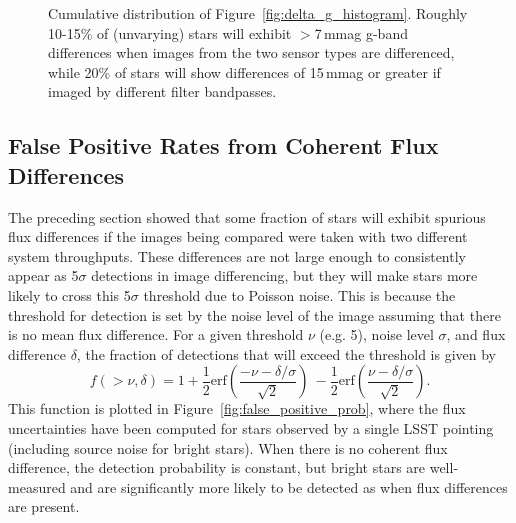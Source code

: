 \documentclass[DM,toc]{lsstdoc}
\begin{document}
\begin{figure}
\caption{Cumulative distribution of Figure~\ref{fig:delta_g_histogram}. Roughly
10-15\% of (unvarying) stars will exhibit $>$7\,mmag g-band differences when
images from the two sensor types are differenced, while 20\% of stars will show
differences of 15\,mmag or greater if imaged by different filter bandpasses.
\label{fig:delta_g_cumulative}}
\end{figure}


\subsection{False Positive Rates from Coherent Flux Differences}

The preceding section showed that some fraction of stars will exhibit spurious
flux differences if the images being compared were taken with two different
system throughputs. These differences are not large enough to consistently
appear as 5$\sigma$ detections in image differencing, but they will make stars
more likely to cross this 5$\sigma$ threshold due to Poisson noise. This is
because the threshold for detection is set by the noise level of the image
assuming that there is no mean flux difference. For a given threshold $\nu$
(e.g. 5), noise level $\sigma$, and flux difference $\delta$, the fraction of
detections that will exceed the threshold is given by
%
\begin{equation}
  f( > \nu, \delta) = 1 + \frac{1}{2}\textrm{erf}\left( \frac{-\nu - \delta/\sigma}{\sqrt{2}}\right) \
  - \frac{1}{2}\textrm{erf}\left( \frac{\nu - \delta/\sigma}{\sqrt{2}}\right).
\end{equation}
%
This function is plotted in Figure~\ref{fig:false_positive_prob}, where the flux
uncertainties have been computed for stars observed by a single LSST pointing
(including source noise for bright stars). When there is no coherent flux
difference, the detection probability is constant, but bright stars are
well-measured and are significantly more likely to be detected as \DIASources
when flux differences are present.
\end{document}
